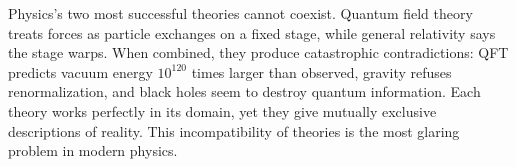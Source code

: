 Physics's two most successful theories cannot coexist. Quantum field theory treats forces as particle exchanges on a fixed stage, while general relativity says the stage warps. When combined, they produce catastrophic contradictions: QFT predicts vacuum energy $10^{120}$ times larger than observed, gravity refuses renormalization, and black holes seem to destroy quantum information. Each theory works perfectly in its domain, yet they give mutually exclusive descriptions of reality. This incompatibility of theories is the most glaring problem in modern physics.
